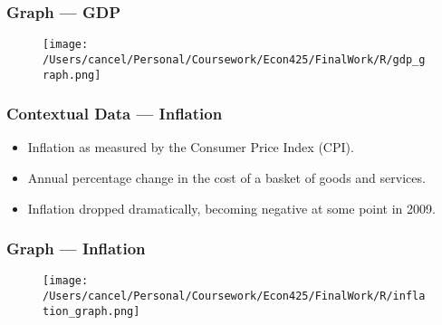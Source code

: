 \documentclass{beamer}
\begin{document}
\begin{frame}
    \frametitle{Graph --- GDP}
    \begin{figure}[h!]
        \centering
        \texttt{[image: /Users/cancel/Personal/Coursework/Econ425/FinalWork/R/gdp\_graph.png]}
    \end{figure}
\end{frame}

\begin{frame}
    \frametitle{Contextual Data --- Inflation}
    \begin{itemize}
        \item Inflation as measured by the Consumer Price Index (CPI).
        \item Annual percentage change in the cost of a basket of goods and services.
        \item Inflation dropped dramatically, becoming negative at some point in 2009.
    \end{itemize}
\end{frame}

\begin{frame}
    \frametitle{Graph --- Inflation}
    \begin{figure}[h!]
        \centering
        \texttt{[image: /Users/cancel/Personal/Coursework/Econ425/FinalWork/R/inflation\_graph.png]}
    \end{figure}
\end{frame}
\end{document}

